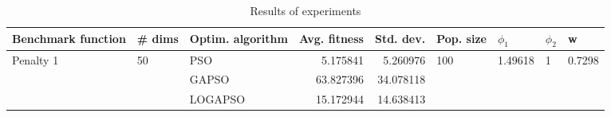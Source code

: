 \begin{table}
\centering
\caption{Results of experiments}
\begin{tabular}{lllrrllll}
\toprule
        Benchmark function &             \# dims & Optim. algorithm &  Avg. fitness &  Std. dev. &            Pop. size &               $\phi_{1}$ &         $\phi_{2}$ &                       w \\
\midrule
\multirow{3}{*}{Penalty 1} & \multirow{3}{*}{50} &              PSO &      5.175841 &   5.260976 & \multirow{3}{*}{100} & \multirow{3}{*}{1.49618} & \multirow{3}{*}{1} & \multirow{3}{*}{0.7298} \\
                           &                     &            GAPSO &     63.827396 &  34.078118 &                      &                          &                    &                         \\
                           &                     &          LOGAPSO &     15.172944 &  14.638413 &                      &                          &                    &                         \\
\bottomrule
\end{tabular}
\end{table}
